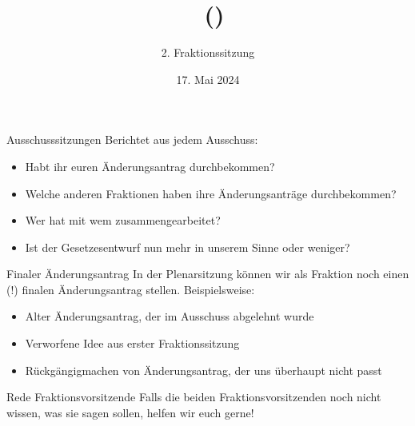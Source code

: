 \documentclass{beamer}
\title{\Fraktionsname\ (\Fraktionskuerzel)}
\subtitle{2. Fraktionssitzung}
\date{17. Mai 2024}
\begin{document}
\frame{\titlepage}

\begin{frame}{Ausschusssitzungen} %
\vspace{-1.5cm}
Berichtet aus jedem Ausschuss:
\newline
\begin{itemize}
    \item Habt ihr euren Änderungsantrag durchbekommen?
    \item Welche anderen Fraktionen haben ihre Änderungsanträge durchbekommen?
    \item Wer hat mit wem zusammengearbeitet?
    \item Ist der Gesetzesentwurf nun mehr in unserem Sinne oder weniger?
\end{itemize}
\end{frame}

\begin{frame}{Finaler Änderungsantrag} %
\vspace{-0.5cm}
In der Plenarsitzung können wir als Fraktion noch einen (!) finalen Änderungsantrag stellen. Beispielsweise: \newline
\begin{itemize}
    \item Alter Änderungsantrag, der im Ausschuss abgelehnt wurde
    \item Verworfene Idee aus erster Fraktionssitzung
    \item Rückgängigmachen von Änderungsantrag, der uns überhaupt nicht passt
\end{itemize}
\end{frame}

\begin{frame}{Rede Fraktionsvorsitzende}
\vspace{-1.5cm}
Falls die beiden Fraktionsvorsitzenden noch nicht wissen, was sie sagen sollen, helfen wir euch gerne!
\end{frame}
\end{document}
